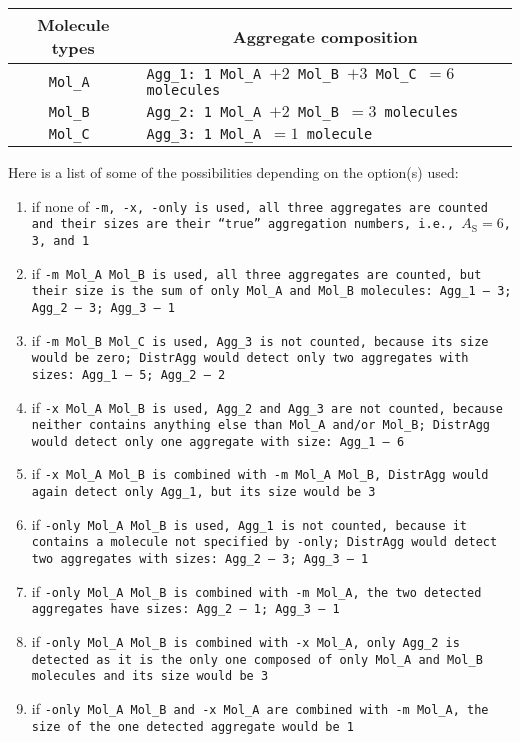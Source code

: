 \begin{longtable}{c|l}
  \toprule
  Molecule types & \multicolumn{1}{c}{Aggregate composition} \\
  \midrule
  \tt{Mol_A} & \tt{Agg_1}: 1 \tt{Mol_A} $+2$ \tt{Mol_B} $+3$ \tt{Mol_C} $=6$ molecules \\
  \tt{Mol_B} & \tt{Agg_2}: 1 \tt{Mol_A} $+2$ \tt{Mol_B} $=3$ molecules \\
  \tt{Mol_C} & \tt{Agg_3}: 1 \tt{Mol_A} $=1$ molecule \\
  \bottomrule
\end{longtable}

\noindent
Here is a list of some of the possibilities depending on the option(s)
used:
\begin{enumerate}[nosep]
  \item if none of \tt{-m}, \tt{-x}, \tt{-only} is used, all three aggregates
    are counted and their sizes are their \enquote{true} aggregation numbers,
    i.e., $A_{\text{S}}=6$, 3, and 1
  \item if \tt{-m Mol_A Mol_B} is used, all three aggregates are
    counted, but their size is the sum of only \tt{Mol_A} and
    \tt{Mol_B} molecules: \tt{Agg_1} -- 3; \tt{Agg_2} -- 3;
    \tt{Agg_3} -- 1
  \item if \tt{-m Mol_B Mol_C} is used, \tt{Agg_3} is not
    counted, because its size would be zero; \tt{DistrAgg} would detect
    only two aggregates with sizes: \tt{Agg_1} -- 5; \tt{Agg_2} --
    2
  \item if \tt{-x Mol_A Mol_B} is used, \tt{Agg_2} and
    \tt{Agg_3} are not counted, because neither contains anything else
    than \tt{Mol_A} and/or \tt{Mol_B}; \tt{DistrAgg} would
    detect only one aggregate with size: \tt{Agg_1} -- 6
  \item if \tt{-x Mol_A Mol_B} is combined with \tt{-m Mol_A
    Mol_B}, \tt{DistrAgg} would again detect only \tt{Agg_1}, but
    its size would be 3
  \item if \tt{-only Mol_A Mol_B} is used, \tt{Agg_1} is not
    counted, because it contains a molecule not specified by
    \tt{-only}; \tt{DistrAgg} would detect two aggregates
    with sizes: \tt{Agg_2} -- 3; \tt{Agg_3} -- 1
  \item if \tt{-only Mol_A Mol_B} is combined with \tt{-m
    Mol_A}, the two detected aggregates have sizes: \tt{Agg_2} -- 1;
    \tt{Agg_3} -- 1
  \item if \tt{-only Mol_A Mol_B} is combined with \tt{-x
    Mol_A}, only \tt{Agg_2} is detected as it is the only one composed of
    only \tt{Mol_A} and \tt{Mol_B} molecules and its size would
    be 3
  \item if \tt{-only Mol_A Mol_B} and \tt{-x Mol_A} are combined
    with \tt{-m Mol_A}, the size of the one detected aggregate would be 1
\end{enumerate}
\vspace{1em}

